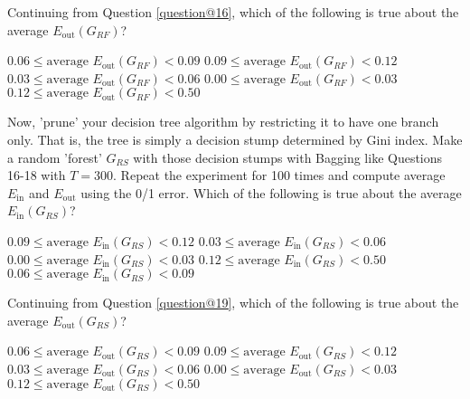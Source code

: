 \documentclass[a4paper,10pt]{exam}
\begin{document}
\begin{questions}
	\question Continuing from Question \ref{question@16}, which of the following is true about the average $E_{\text{out}}(G_{RF})$?
	\begin{checkboxes}
		\CorrectChoice $0.06 \leq \mbox{average } E_{\text{out}}(G_{RF}) < 0.09$
		\choice $0.09 \leq \mbox{average } E_{\text{out}}(G_{RF}) < 0.12$
		\choice $0.03 \leq \mbox{average } E_{\text{out}}(G_{RF}) < 0.06$
		\choice $0.00 \leq \mbox{average } E_{\text{out}}(G_{RF}) < 0.03$
		\choice $0.12 \leq \mbox{average } E_{\text{out}}(G_{RF}) < 0.50$\\
	\end{checkboxes}

	\question Now, 'prune' your decision tree algorithm by restricting it to have one branch only. That is, the tree is simply a decision stump determined by Gini index. Make a random 'forest' $G_{RS}$ with those decision stumps with Bagging like Questions 16-18 with $T=300$. Repeat the experiment for 100 times and compute average $E_{\text{in}}$ and $E_{\text{out}}$ using the 0/1 error.
	Which of the following is true about the average $E_{\text{in}}(G_{RS})$?

	\begin{checkboxes}
		\CorrectChoice $0.09 \leq \mbox{average } E_{\text{in}}(G_{RS}) < 0.12$
		\choice $0.03 \leq \mbox{average } E_{\text{in}}(G_{RS}) < 0.06$
		\choice $0.00 \leq \mbox{average } E_{\text{in}}(G_{RS}) < 0.03$
		\choice $0.12 \leq \mbox{average } E_{\text{in}}(G_{RS}) < 0.50$
		\choice $0.06 \leq \mbox{average } E_{\text{in}}(G_{RS}) < 0.09$\\
	\end{checkboxes}

	\question Continuing from Question \ref{question@19}, which of the following is true about the average $E_{\text{out}}(G_{RS})$?
	\begin{checkboxes}
		\choice $0.06 \leq \mbox{average } E_{\text{out}}(G_{RS}) < 0.09$
		\choice $0.09 \leq \mbox{average } E_{\text{out}}(G_{RS}) < 0.12$
		\choice $0.03 \leq \mbox{average } E_{\text{out}}(G_{RS}) < 0.06$
		\choice $0.00 \leq \mbox{average } E_{\text{out}}(G_{RS}) < 0.03$
		\CorrectChoice $0.12 \leq \mbox{average } E_{\text{out}}(G_{RS}) < 0.50$\\
	\end{checkboxes}
\end{questions}
\end{document}
